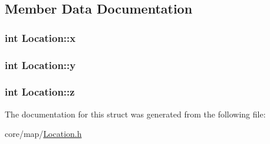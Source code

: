 \subsection{Member Data Documentation}
\hypertarget{structLocation_aea76eebc474e30c04c53e5f03c6749e3}{
\subsubsection[{x}]{\setlength{\rightskip}{0pt plus 5cm}int Location\-::x}}\label{structLocation_aea76eebc474e30c04c53e5f03c6749e3}
\hypertarget{structLocation_a307809776b981810147af56d9304e273}{
\subsubsection[{y}]{\setlength{\rightskip}{0pt plus 5cm}int Location\-::y}}\label{structLocation_a307809776b981810147af56d9304e273}
\hypertarget{structLocation_ad46e606795ee67a3775a53da49b37284}{
\subsubsection[{z}]{\setlength{\rightskip}{0pt plus 5cm}int Location\-::z}}\label{structLocation_ad46e606795ee67a3775a53da49b37284}


The documentation for this struct was generated from the following file\-:\begin{DoxyCompactItemize}
\item 
core/map/\hyperlink{Location_8h}{Location.\-h}\end{DoxyCompactItemize}
